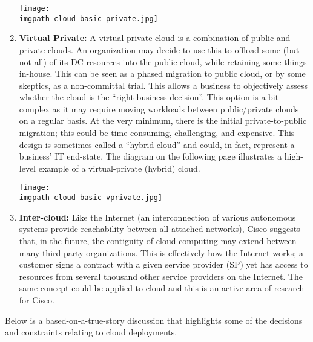\begin{enumerate}
    \begin{minipage}[t]{\linewidth}
	  \centering
      \texttt{[image: \\imgpath cloud-basic-private.jpg]}
    \end{minipage}

  \item \textbf{Virtual Private:} A virtual private cloud is a combination of
  public and private clouds. An organization may decide to use this to offload
  some (but not all) of its DC resources into the public cloud, while
  retaining some things in-house. This can be seen as a phased migration to
  public cloud, or by some skeptics, as a non-committal trial. This allows a
  business to objectively assess whether the cloud is the ``right business
  decision''. This option is a bit complex as it may require moving workloads
  between public/private clouds on a regular basis. At the very minimum, there
  is the initial private-to-public migration; this could be time consuming,
  challenging, and expensive. This design is sometimes called a ``hybrid cloud''
  and could, in fact, represent a business’ IT end-state. The diagram on the
  following page illustrates a high-level example of a virtual-private
  (hybrid) cloud.

    \begin{minipage}[t]{\linewidth}
	  \centering
      \texttt{[image: \\imgpath cloud-basic-vprivate.jpg]}
    \end{minipage}

  \item \textbf{Inter-cloud:} Like the Internet (an interconnection of various
  autonomous systems provide reachability between all attached networks),
  Cisco suggests that, in the future, the contiguity of cloud computing may
  extend between many third-party organizations. This is effectively how the
  Internet works; a customer signs a contract with a given service provider
  (SP) yet has access to resources from several thousand other service
  providers on the Internet. The same concept could be applied to cloud and
  this is an active area of research for Cisco.
\end{enumerate}

Below is a based-on-a-true-story discussion that highlights some of the
decisions and constraints relating to cloud deployments.

